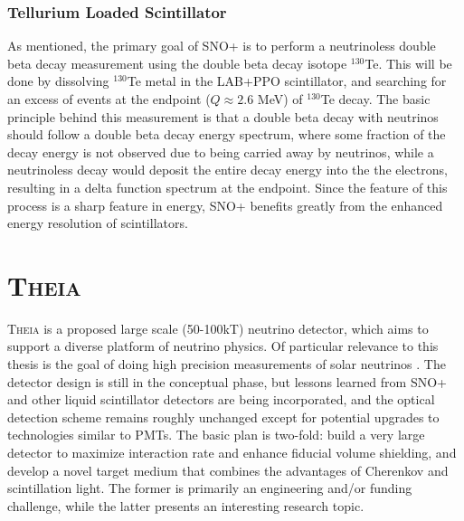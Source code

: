 \subsubsection{Tellurium Loaded Scintillator}
As mentioned, the primary goal of SNO+ is to perform a neutrinoless double beta decay measurement using the double beta decay isotope $^{130}$Te.
This will be done by dissolving $^{130}$Te metal in the LAB+PPO scintillator, and searching for an excess of events at the endpoint ($Q \approx 2.6$ MeV) of $^{130}$Te decay.
The basic principle behind this measurement is that a double beta decay with neutrinos should follow a double beta decay energy spectrum, where some fraction of the decay energy is not observed due to being carried away by neutrinos, while a neutrinoless decay would deposit the entire decay energy into the the electrons, resulting in a delta function spectrum at the endpoint.
Since the feature of this process is a sharp feature in energy, SNO+ benefits greatly from the enhanced energy resolution of scintillators.


\section{\textsc{Theia}}

\textsc{Theia} \cite{asdc_paper} is a proposed large scale (50-100kT) neutrino detector, which aims to support a diverse platform of neutrino physics. 
Of particular relevance to this thesis is the goal of doing high precision measurements of solar neutrinos \cite{theia_solar}.
The detector design is still in the conceptual phase, but lessons learned from SNO+ and other liquid scintillator detectors are being incorporated, and the optical detection scheme remains roughly unchanged except for potential upgrades to technologies similar to PMTs.
The basic plan is two-fold: build a very large detector to maximize interaction rate and enhance fiducial volume shielding, and develop a novel target medium that combines the advantages of Cherenkov and scintillation light.
The former is primarily an engineering and/or funding challenge, while the latter presents an interesting research topic.



